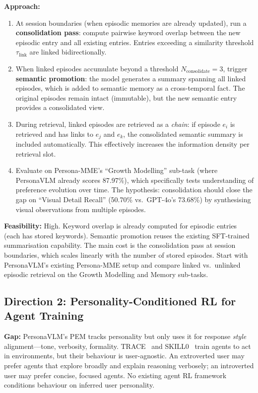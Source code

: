 \documentclass[11pt]{article}
\begin{document}
\textbf{Approach:}
\begin{enumerate}
    \item At session boundaries (when episodic memories are already updated), run a \textbf{consolidation pass}: compute pairwise keyword overlap between the new episodic entry and all existing entries. Entries exceeding a similarity threshold $\tau_{\mathrm{link}}$ are linked bidirectionally.

    \item When linked episodes accumulate beyond a threshold $N_{\mathrm{consolidate}} = 3$, trigger \textbf{semantic promotion}: the model generates a summary spanning all linked episodes, which is added to semantic memory as a cross-temporal fact. The original episodes remain intact (immutable), but the new semantic entry provides a consolidated view.

    \item During retrieval, linked episodes are retrieved as a \textit{chain}: if episode $e_i$ is retrieved and has links to $e_j$ and $e_k$, the consolidated semantic summary is included automatically. This effectively increases the information density per retrieval slot.

    \item Evaluate on Persona-MME's ``Growth Modelling'' sub-task (where PersonaVLM already scores 87.97\%), which specifically tests understanding of preference evolution over time. The hypothesis: consolidation should close the gap on ``Visual Detail Recall'' (50.70\% vs.\ GPT-4o's 73.68\%) by synthesising visual observations from multiple episodes.
\end{enumerate}

\textbf{Feasibility:} High. Keyword overlap is already computed for episodic entries (each has stored keywords). Semantic promotion reuses the existing SFT-trained summarisation capability. The main cost is the consolidation pass at session boundaries, which scales linearly with the number of stored episodes. Start with PersonaVLM's existing Persona-MME setup and compare linked vs.\ unlinked episodic retrieval on the Growth Modelling and Memory sub-tasks.

\subsection{Direction 2: Personality-Conditioned RL for Agent Training}

\textbf{Gap:} PersonaVLM's PEM tracks personality but only uses it for response \textit{style} alignment---tone, verbosity, formality. TRACE~\cite{trace} and SKILL0~\cite{skill0} train agents to act in environments, but their behaviour is user-agnostic. An extroverted user may prefer agents that explore broadly and explain reasoning verbosely; an introverted user may prefer concise, focused agents. No existing agent RL framework conditions behaviour on inferred user personality.
\end{document}
